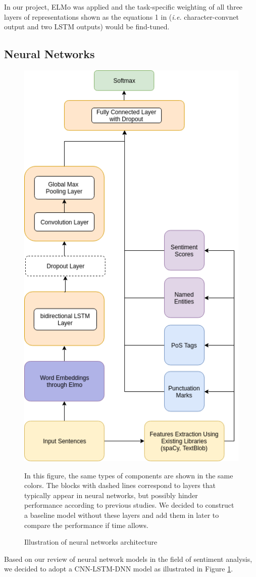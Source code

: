 \documentclass[12pt]{diazessay} %
\begin{document}
{In our project, ELMo was applied and the task-specific weighting of all three layers of representations shown as the equations 1 in  \citet{peters2018deep} (\textit{i.e.} character-convnet output and two LSTM outputs) would be find-tuned.


\subsection{Neural Networks}
\begin{figure}[ht!]
	\includegraphics[height=0.7\textheight, center]{graphs/nn_architecture.png}
	\caption{Illustration of neural networks architecture}
	\medskip
	\small
	In this figure, the same types of components are shown in the same colors. The blocks with dashed lines correspond to layers that typically appear in neural networks, but possibly hinder performance according to previous studies. We decided to construct a baseline model without these layers and add them in later to compare the performance if time allows. 
	\label{figure:nnarchitecture}
\end{figure}
Based on our review of neural network models in the field of sentiment analysis, we decided to adopt a CNN-LSTM-DNN model as illustrated in Figure \ref{figure:nnarchitecture}. 

}
\end{document}
